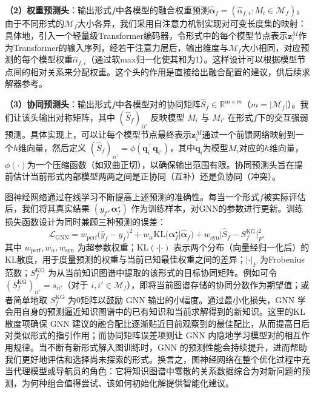 \documentclass[../main.tex]{subfiles}
\begin{document}
\textbf{（2）权重预测头}：输出形式$f$中各模型的融合权重预测$\hat{\boldsymbol{\alpha}}_f = (\hat{\alpha}_{f,i}: M_i \in \mathcal{M}_f)$。由于不同形式的$\mathcal{M}_f$大小各异，我们采用自注意力机制实现对可变长度集的映射：具体地，引入一个轻量级Transformer编码器\cite{vaswani2017attention}，令形式中的每个模型节点表示$\mathbf{z}^M_i$作为Transformer的输入序列，经若干注意力层后，输出维度与$\mathcal{M}_f$大小相同，对应预测的每个模型权重$\hat{\alpha}_{f,i}$（通过软max归一化使其和为1）。这样设计可以根据模型节点间的相对关系来分配权重。这个头的作用是直接给出融合配置的建议，供后续求解器参考。

\textbf{（3）协同预测头}：输出形式$f$中各模型对的协同矩阵$\hat{S}_f \in \mathbb{R}^{m\times m}$（$m=|\mathcal{M}_f|$）。我们让该头输出对称矩阵，其中 $(\hat{S}_f)_{ii'}$ 反映模型 $M_i$ 与 $M_{i'}$ 在形式$f$下的交互强弱预测。具体实现上，可以让每个模型节点最终表示$\mathbf{z}^M_i$通过一个前馈网络映射到一个$h$维向量，然后定义 $(\hat{S}_f)_{ii'} = \phi(\mathbf{q}_i^\top \mathbf{q}_{i'})$，其中$\mathbf{q}_i$为模型$M_i$对应的$h$维向量，$\phi(\cdot)$为一个压缩函数（如双曲正切），以确保输出范围有限。协同预测头旨在提前估计当前形式内部模型两两之间是正协同（互补）还是负协同（冲突）。

图神经网络通过在线学习不断提高上述预测的准确性。每当一个形式$f$被实际评估后，我们将其真实结果 $(y_f, \boldsymbol{\alpha}_f^\star)$ 作为训练样本，对GNN的参数进行更新。训练损失函数设计为同时兼顾三种预测的误差：
\begin{equation}
	\mathcal{L}_{\text{GNN}} =
	w_{\text{perf}}\big(\hat{y}_f - y_f\big)^2
	+
	w_{\alpha}\text{KL}\big(\boldsymbol{\alpha}_f^\star | \hat{\boldsymbol{\alpha}}_f\big)
	+
	w_{\text{syn}}\big|\hat{S}_f - S^{\text{KG}}_f\big|_F^2,
\end{equation}
其中 $w_{\text{perf}}, w_{\alpha}, w_{\text{syn}}$ 为超参数权重；$\text{KL}(\cdot|\cdot)$ 表示两个分布（向量经归一化后）的KL散度，用于度量预测的权重与当前已知最佳权重之间的差异；$|\cdot|_F$ 为Frobenius范数；$S^{\text{KG}}_f$ 为从当前知识图谱中提取的该形式的目标协同矩阵。例如可令 $(S^{\text{KG}}_f)_{ii'} = s_{ii'}$（对于 $i,i'\in \mathcal{M}_f$），即将当前图谱存储的协同分数作为期望值；或者简单地取 $S^{\text{KG}}_f$ 为0矩阵以鼓励 GNN 输出的小幅度。通过最小化损失，GNN 学会用自身的预测逼近知识图谱中的已有知识和当前求解得到的新知识。这里的KL散度项确保 GNN 建议的融合配比逐渐贴近目前观察到的最佳配比，从而提高日后对类似形式的指引作用；而协同矩阵误差项则让 GNN 内隐地学习模型对的相互作用规律。当不断有新形式解入图训练时，GNN 的预测性能会持续提升，进而帮助我们更好地评估和选择尚未探索的形式。换言之，图神经网络在整个优化过程中充当代理模型或导航员的角色：它将知识图谱中零散的关系数据综合为对新问题的预测，为何种组合值得尝试、该如何初始化解提供智能化建议。
\end{document}
